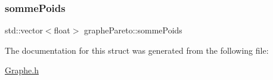 \subsubsection{\texorpdfstring{sommePoids}{sommePoids}}
{\footnotesize\ttfamily std\+::vector$<$float$>$ graphe\+Pareto\+::somme\+Poids}



The documentation for this struct was generated from the following file\+:\begin{DoxyCompactItemize}
\item 
\mbox{\hyperlink{_graphe_8h}{Graphe.\+h}}\end{DoxyCompactItemize}
